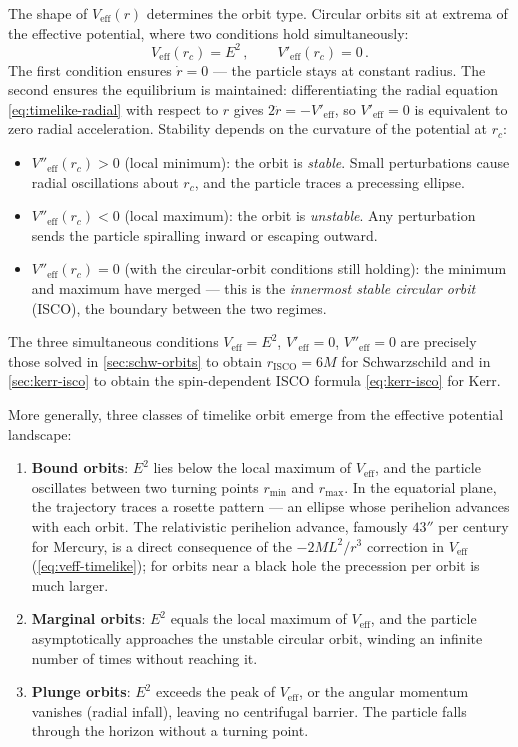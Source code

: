 The shape of $V_{\text{eff}}(r)$ determines the orbit type.
Circular orbits sit at extrema of the effective potential, where two
conditions hold simultaneously:
%
\begin{equation}
  V_{\text{eff}}(r_c) = E^2 \,, \qquad
  V'_{\text{eff}}(r_c) = 0 \,.
  \label{eq:geo-circular-conditions}
\end{equation}
%
The first condition ensures $\dot{r} = 0$ --- the particle stays at
constant radius.  The second ensures the equilibrium is maintained:
differentiating the radial equation \cref{eq:timelike-radial} with
respect to $r$ gives $2\ddot{r} = -V'_{\text{eff}}$, so
$V'_{\text{eff}} = 0$ is equivalent to zero radial acceleration.
Stability depends on the curvature of the potential at $r_c$:
%
\begin{itemize}
\item $V''_{\text{eff}}(r_c) > 0$ (local minimum): the orbit is
  \emph{stable}.  Small perturbations cause radial oscillations
  about $r_c$, and the particle traces a precessing ellipse.
\item $V''_{\text{eff}}(r_c) < 0$ (local maximum): the orbit is
  \emph{unstable}.  Any perturbation sends the particle spiralling
  inward or escaping outward.
\item $V''_{\text{eff}}(r_c) = 0$ (with the circular-orbit
  conditions still holding): the minimum and maximum have merged
  --- this is the \emph{innermost stable circular orbit} (ISCO),
  the boundary between the two regimes.
\end{itemize}
%
The three simultaneous conditions $V_{\text{eff}} = E^2$,
$V'_{\text{eff}} = 0$, $V''_{\text{eff}} = 0$ are precisely those
solved in \cref{sec:schw-orbits} to obtain
$r_{\text{ISCO}} = 6M$ for Schwarzschild and in
\cref{sec:kerr-isco} to obtain the spin-dependent ISCO formula
\cref{eq:kerr-isco} for Kerr.

More generally, three classes of timelike orbit emerge from the
effective potential landscape:
%
\begin{enumerate}
\item \textbf{Bound orbits}: $E^2$ lies below the local
  maximum of $V_{\text{eff}}$, and the particle oscillates between
  two turning points $r_{\text{min}}$ and $r_{\text{max}}$.  In
  the equatorial plane, the trajectory traces a rosette pattern ---
  an ellipse whose perihelion advances with each orbit.  The
  relativistic perihelion advance, famously $43''$ per century for
  Mercury, is a direct consequence of the $-2ML^2/r^3$ correction
  in $V_{\text{eff}}$ (\cref{eq:veff-timelike}); for orbits near
  a black hole the precession per orbit is much larger.
\item \textbf{Marginal orbits}: $E^2$ equals the local
  maximum of $V_{\text{eff}}$, and the particle asymptotically
  approaches the unstable circular orbit, winding an infinite
  number of times without reaching it.
\item \textbf{Plunge orbits}: $E^2$ exceeds the peak of
  $V_{\text{eff}}$, or the angular momentum vanishes (radial
  infall), leaving no centrifugal barrier.  The particle falls
  through the horizon without a turning point.
\end{enumerate}

